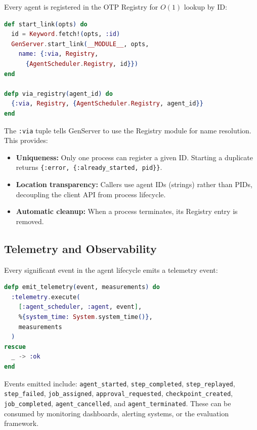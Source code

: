 \documentclass[12pt,a4paper]{article}
\theoremstyle{definition}
\theoremstyle{remark}
\begin{document}
Every agent is registered in the OTP Registry for $O(1)$ lookup by ID:

\begin{lstlisting}[language=elixir, caption={Registry-based process naming (from \texttt{agent.ex})}, label={lst:registry}]
def start_link(opts) do
  id = Keyword.fetch!(opts, :id)
  GenServer.start_link(__MODULE__, opts,
    name: {:via, Registry,
      {AgentScheduler.Registry, id}})
end

defp via_registry(agent_id) do
  {:via, Registry, {AgentScheduler.Registry, agent_id}}
end
\end{lstlisting}

The \texttt{:via} tuple tells GenServer to use the Registry module for name resolution. This provides:
\begin{itemize}[leftmargin=2em]
  \item \textbf{Uniqueness:} Only one process can register a given ID. Starting a duplicate returns \texttt{\{:error, \{:already\_started, pid\}\}}.
  \item \textbf{Location transparency:} Callers use agent IDs (strings) rather than PIDs, decoupling the client API from process lifecycle.
  \item \textbf{Automatic cleanup:} When a process terminates, its Registry entry is removed.
\end{itemize}

\subsection{Telemetry and Observability}

Every significant event in the agent lifecycle emits a telemetry event:

\begin{lstlisting}[language=elixir, caption={Telemetry emission (from \texttt{agent.ex})}, label={lst:telemetry}]
defp emit_telemetry(event, measurements) do
  :telemetry.execute(
    [:agent_scheduler, :agent, event],
    %{system_time: System.system_time()},
    measurements
  )
rescue
  _ -> :ok
end
\end{lstlisting}

Events emitted include: \texttt{agent\_started}, \texttt{step\_completed}, \texttt{step\_replayed}, \texttt{step\_failed}, \texttt{job\_assigned}, \texttt{approval\_requested}, \texttt{checkpoint\_created}, \texttt{job\_completed}, \texttt{agent\_cancelled}, and \texttt{agent\_terminated}. These can be consumed by monitoring dashboards, alerting systems, or the evaluation framework.
\end{document}

